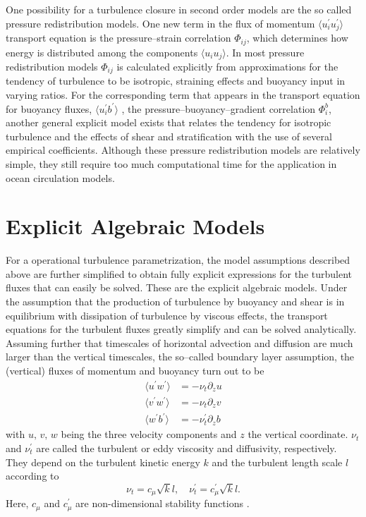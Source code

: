 One possibility for a turbulence closure in second order models are the so 
called pressure redistribution models. One new term in the flux of momentum 
$\langle u_i^\prime u_j^\prime \rangle$ transport equation is the 
pressure--strain correlation $\Phi_{ij}$, which determines how energy is 
distributed among the components $\langle u_i u_j \rangle$. In most pressure 
redistribution models $\Phi_{ij}$ is calculated explicitly from approximations 
for the tendency of turbulence to be isotropic, straining effects and buoyancy 
input in varying ratios. For the corresponding term that appears in the 
transport equation for buoyancy fluxes, $\langle u_i^\prime b^\prime \rangle$ , 
the pressure--buoyancy--gradient correlation $\Phi_i^b$, another 
general explicit model exists that relates the tendency for isotropic 
turbulence and the effects of shear and stratification with the use of several 
empirical coefficients. Although these pressure redistribution models are 
relatively simple, they still require too much computational time for the 
application in ocean circulation models. 

\section{Explicit Algebraic Models}

For a operational turbulence parametrization, the model assumptions described 
above are further simplified to obtain fully explicit expressions for the 
turbulent fluxes that can easily be solved. These are the explicit algebraic 
models. Under the assumption that the production of turbulence by buoyancy and 
shear is in equilibrium with dissipation of turbulence by viscous effects, the 
transport equations for the turbulent fluxes greatly simplify and can be solved 
analytically. Assuming further that timescales of horizontal advection and 
diffusion are much larger than the vertical timescales, the so--called boundary 
layer assumption, the (vertical) fluxes of momentum and buoyancy turn out to be 
\begin{align}
 \label{bblassum}
 \langle u^\prime w^\prime \rangle &= - \nu_t \partial_z u \\
 \langle v^\prime w^\prime \rangle &= - \nu_t \partial_z v \\
 \langle w^\prime b^\prime \rangle &= - \nu_t^\prime \partial_z b
\end{align}
with $u,\,v,\,w$ being the three velocity components and $z$ the vertical 
coordinate. $\nu_t$ and $\nu_t^\prime$ are called the turbulent or eddy 
viscosity and diffusivity, respectively. They depend on the turbulent kinetic 
energy $k$ and the turbulent length scale $l$ according to
\begin{equation}
 \label{turbdiff}
 \nu_t = c_\mu \sqrt{k} l, \quad \nu_t^\prime = c_\mu^\prime \sqrt{k} l.
\end{equation}
Here, $c_\mu$ and $c_\mu^\prime$ are non-dimensional stability 
functions \citep[][]{gotm1999}.

